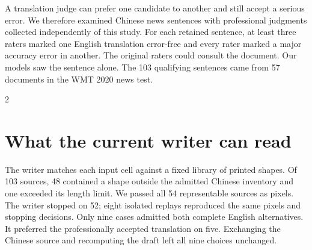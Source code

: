 \noindent A translation judge can prefer one candidate to another and still accept a serious error. We therefore examined Chinese news sentences with professional judgments collected independently of this study. For each retained sentence, at least three raters marked one English translation error-free and every rater marked a major accuracy error in another. The original raters could consult the document. Our models saw the sentence alone. The 103 qualifying sentences came from 57 documents in the WMT 2020 news test.\cite{freitagmqm}


\begin{multicols}{2}
\section*{What the current writer can read}
The writer matches each input cell against a fixed library of printed shapes. Of 103 sources, 48 contained a shape outside the admitted Chinese inventory and one exceeded its length limit. We passed all 54 representable sources as pixels. The writer stopped on 52; eight isolated replays reproduced the same pixels and stopping decisions. Only nine cases admitted both complete English alternatives. It preferred the professionally accepted translation on five. Exchanging the Chinese source and recomputing the draft left all nine choices unchanged.

\end{multicols}
